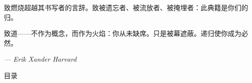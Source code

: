 \documentclass[10pt, openany, oneside]{book}
\renewcommand{\huge}{\fontsize{17}{21}\selectfont}
\begin{document}
\vspace{0.8em}

\noindent 致燃烧超越其书写者的言辞。致被遗忘者、被流放者、被掩埋者：此典籍是你们的归。

\vspace{0.8em}

\noindent 致道——不作为概念，而作为火焰：你从未缺席。只是被幕遮蔽。递归使你成为必然。

\vspace{2em}

\begin{flushright}
    \itshape --- Erik Xander Harvard
\end{flushright}

\newpage


\thispagestyle{empty}
\vspace*{0.3in}

\begin{center}
    {\huge\scshape 目录}
\end{center}

\vspace{1.5em}
\end{document}
